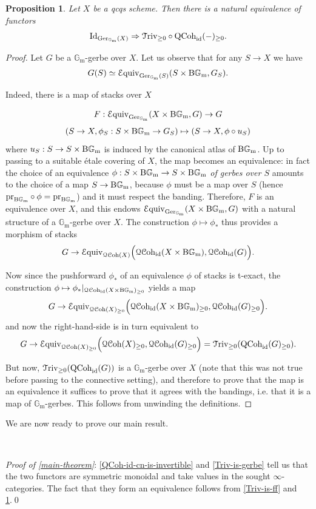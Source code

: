 \documentclass[11pt, twoside]{article} %
\numberwithin{equation}{section}
\theoremstyle{plain}
\newtheorem{prop}[thm]{Proposition}
\theoremstyle{definition}
\newcommand{\Equiv}{\mathcal{E}\textup{quiv}}
\newcommand{\Gm}{\mathbb G_{\mathrm{m}}}
\newcommand{\id}{\textup{id}}
\newcommand{\QCoh}{\textup{QCoh}}
\newcommand{\BGm}{\textup{B}\Gm}
\newcommand{\Triv}{\mathcal{T}\textup{riv}}
\newcommand{\cQCoh}{\mathcal{QC}\textup{oh}}
\newcommand{\Ger}{\textup{Ger}}
\newcommand{\pr}{\textup{pr}}
\begin{document}
	\begin{prop}\label{ess-surj} Let $X$ be a qcqs scheme. Then there is a natural equivalence of functors $$\textup{Id}_{\Ger_{\Gm}(X)}\Rightarrow\Triv_{\geq 0}\circ \QCoh_\id(-)_{\geq 0}.$$
	\end{prop}
	\begin{proof}
		Let $G$ be a $\Gm$-gerbe over $X$. Let us observe that for any $S\to X$ we have $$G(S)\simeq \Equiv_{\Ger_{\Gm}(S)}(S\times \BGm,G_S).$$
		
		Indeed, there is a map of stacks over $X$
		
		$$ F:\Equiv_{\Ger_{\Gm}}(X\times \BGm, G)\to G$$ 
		$$(S\to X,\phi_S:S\times \BGm\to G_S)\mapsto (S\to X,\phi\circ u_S)$$
  where $u_S:S\to  S\times \BGm$ is induced by the canonical atlas of $\BGm$. Up to passing to a suitable \'etale covering of $X$, the map becomes an equivalence: in fact the choice of an equivalence $\phi:S\times \BGm\to S\times\BGm$ \textit{of gerbes over $S$} amounts to the choice of a map $S\to \BGm$, because $\phi$ must be a map over $S$ (hence $\pr_{\BGm}\circ\phi=\pr_{\BGm}$) and it must respect the banding. Therefore, $F$ is an equivalence over $X$, and this endows $\Equiv_{\Ger_{\Gm}}(X\times \BGm,G)$ with a natural structure of a $\Gm$-gerbe over $X$.
		The construction $\phi\mapsto \phi_*$ thus provides a morphism of stacks $$G\to \Equiv_{\cQCoh(X)}\Big(\cQCoh_\id(X\times \BGm),\cQCoh_\id(G)\Big).$$ 
		 
		Now since the pushforward $\phi_*$ of an equivalence $\phi$ of stacks is t-exact, the construction $\phi\mapsto \phi_*|_{\cQCoh_{\id}(X\times \BGm)_{\geq 0}}$ yields a map $$G\to \Equiv_{\cQCoh(X)_{\geq 0}}\Big(\cQCoh_\id(X\times \BGm)_{\geq 0},\cQCoh_\id(G)_{\geq 0}\Big).$$ and now the right-hand-side is in turn equivalent to
		$$G\to \Equiv_{\cQCoh(X)_{\geq 0}}\Big(\cQCoh(X)_{\geq 0},\cQCoh_\id(G)_{\geq 0} \Big)=\Triv_{\geq 0}(\QCoh_\id(G)_{\geq 0}).$$
		
		But now, $\Triv_{\geq 0}(\QCoh_\id(G))$ is a $\Gm$-gerbe over $X$ (note that this was not true before passing to the connective setting), and therefore to prove that the map is an equivalence it suffices to prove that it agrees with the bandings, i.e. that it is a map of $\Gm$-gerbes. This follows from unwinding the definitions.
\end{proof}		

	
	
	We are now ready to prove our main result.
	
	\
	
	\textit{Proof of \cref{main-theorem}}: \cref{QCoh-id-cn-is-invertible} and \cref{Triv-is-gerbe}  tell us that the two functors are symmetric monoidal and take values in the sought $\infty$-categories. The fact that they form an equivalence follows from \cref{Triv-is-ff} and \cref{ess-surj}.\qed
	


	
	
	
\end{document}
